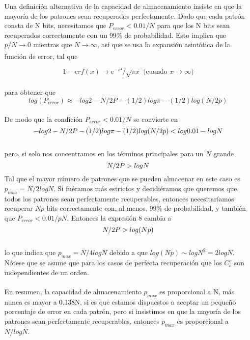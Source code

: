 \documentclass{article}
\begin{document}
Una definición alternativa de la capacidad de almacenamiento insiste en que la mayoría de los patrones sean recuperados perfectamente. Dado que cada patrón consta de N bits, necesitamos que $P_{error} < 0.01/N$ para que los N bits sean recuperados correctamente con un 99\% de probabilidad. Esto implica que $p/N \xrightarrow[]{}{0}$ mientras que $N \xrightarrow[]{}{\infty}$, así que se usa la expansión asintótica de la función de error, tal que

\begin{equation}
    1- erf(x) \xrightarrow[]{}{e^{-x²}/\sqrt{\pi x}} \text{ (cuando } x \xrightarrow[]{}{\infty})
    \label{eq:expansión asintótica}
\end{equation}
\\
para obtener que
\begin{equation}
    log(P_{error}) \approx -log2 -  N/2P -(1/2)log\pi- (1/2)log(N/2p)
    \label{eq:lol}
\end{equation}
\\
De modo que la condición $P_{error} < 0.01/N$ se convierte en
\begin{equation}
    -log2 -  N/2P -(1/2)log\pi- (1/2)log(N/2p) < log0.01 - logN
    \label{eq:condición P_{error}}
\end{equation}
\\pero, si solo nos concentramos en los términos principales para un $N$ grande
\begin{equation}
    N/2P > log N
    \label{eq:condición P_{error}2}
\end{equation}
Tal que el mayor número de patrones que se pueden almacenar en este caso es $p_{max}= N/2 log N$.
Si fuéramos más estrictos y decidiéramos que queremos que todos los patrones sean perfectamente recuperables, entonces necesitaríamos recuperar $Np$ bits correctamente con, al menos, 99\% de probabilidad, y también que $P_{error} < 0.01/pN$. Entonces la expresión 8 cambia a
\begin{equation}
    N/2P > log(Np)
    \label{eq:condición P_{error}3}
\end{equation}
\\
lo que indica que $p_{max} = N/4 log N$ debido a que $log(Np) \sim log N^{2} = 2 log N$. Nótese que se asume que para los casos de perfecta recuperación que los $C_i^v$ son independientes de un orden.
\\\\
En resumen, la capacidad de almacenamiento $p_{max}$ es proporcional a N, más nunca es mayor a 0.138N, si es que estamos dispuestos a aceptar un pequeño porcentaje de error en cada patrón, pero si insistimos en que la mayoría de los patrones sean perfectamente recuperables, entonces $p_{max}$ es proporcional a $N/log N$.
\end{document}
